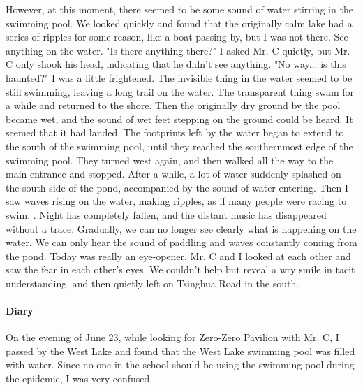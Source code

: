 However, at this moment, there seemed to be some sound of water stirring in the
swimming pool. We looked quickly and found that the originally calm lake had a
series of ripples for some reason, like a boat passing by, but I was not there.
See anything on the water.  "Is there anything there?" I asked Mr. C quietly,
but Mr. C only shook his head, indicating that he didn't see anything. "No
way... is this haunted?" I was a little frightened.  The invisible thing in the
water seemed to be still swimming, leaving a long trail on the water.  The
transparent thing swam for a while and returned to the shore. Then the
originally dry ground by the pool became wet, and the sound of wet feet
stepping on the ground could be heard. It seemed that it had landed.  The
footprints left by the water began to extend to the south of the swimming pool,
until they reached the southernmost edge of the swimming pool. They turned west
again, and then walked all the way to the main entrance and stopped.  After a
while, a lot of water suddenly splashed on the south side of the pond,
accompanied by the sound of water entering. Then I saw waves rising on the
water, making ripples, as if many people were racing to swim. .  Night has
completely fallen, and the distant music has disappeared without a trace.
Gradually, we can no longer see clearly what is happening on the water. We can
only hear the sound of paddling and waves constantly coming from the pond.
Today was really an eye-opener. Mr. C and I looked at each other and saw the
fear in each other's eyes. We couldn't help but reveal a wry smile in tacit
understanding, and then quietly left on Tsinghua Road in the south.

\vfill

\paragraph{Diary} On the evening of June 23, while looking for Zero-Zero
Pavilion with Mr. C, I passed by the West Lake and found that the West Lake
swimming pool was filled with water. Since no one in the school should be using
the swimming pool during the epidemic, I was very confused.
